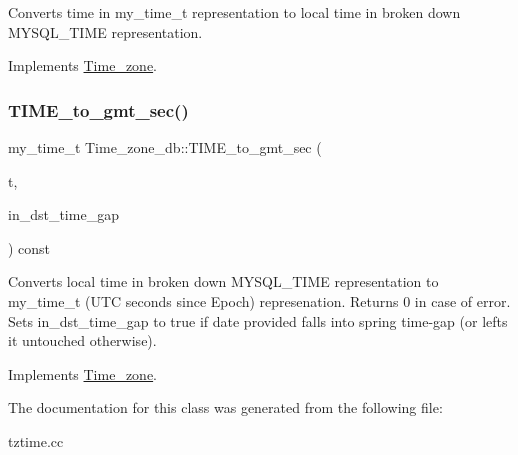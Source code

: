Converts time in my\+\_\+time\+\_\+t representation to local time in broken down M\+Y\+S\+Q\+L\+\_\+\+T\+I\+ME representation. 

Implements \mbox{\hyperlink{classTime__zone_a7a15d4406de10928f8e39eb3549770a4}{Time\+\_\+zone}}.

\mbox{\label{classTime__zone__db_afcb398ef9a0ddc1bafc5fd80b2ad9ea4}} 
\subsubsection{\texorpdfstring{T\+I\+M\+E\+\_\+to\+\_\+gmt\+\_\+sec()}{TIME\_to\_gmt\_sec()}}
{\footnotesize\ttfamily my\+\_\+time\+\_\+t Time\+\_\+zone\+\_\+db\+::\+T\+I\+M\+E\+\_\+to\+\_\+gmt\+\_\+sec (\begin{DoxyParamCaption}\item[{const M\+Y\+S\+Q\+L\+\_\+\+T\+I\+ME $\ast$}]{t,  }\item[{my\+\_\+bool $\ast$}]{in\+\_\+dst\+\_\+time\+\_\+gap }\end{DoxyParamCaption}) const\hspace{0.3cm}{\ttfamily [virtual]}}

Converts local time in broken down M\+Y\+S\+Q\+L\+\_\+\+T\+I\+ME representation to my\+\_\+time\+\_\+t (U\+TC seconds since Epoch) represenation. Returns 0 in case of error. Sets in\+\_\+dst\+\_\+time\+\_\+gap to true if date provided falls into spring time-\/gap (or lefts it untouched otherwise). 

Implements \mbox{\hyperlink{classTime__zone_a980bb1d59fe04e899b116169f1b3166d}{Time\+\_\+zone}}.



The documentation for this class was generated from the following file\+:\begin{DoxyCompactItemize}
\item 
tztime.\+cc\end{DoxyCompactItemize}
